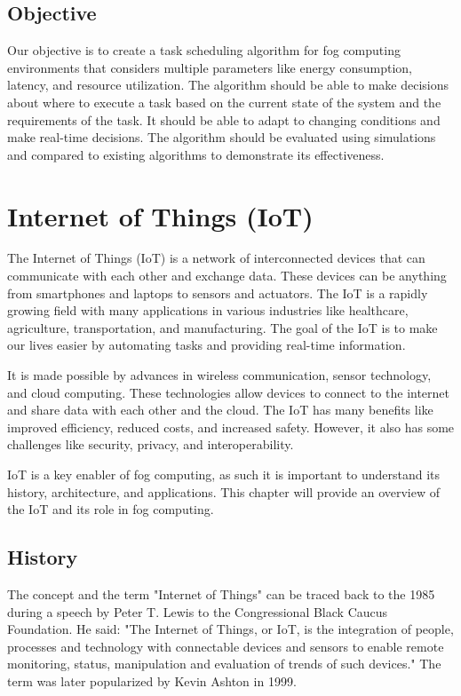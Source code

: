 \section{Objective}
\label{sec:objective}

Our objective is to create a task scheduling algorithm for fog computing environments that considers multiple
parameters like energy consumption, latency, and resource utilization. The algorithm should be able to make decisions
about where to execute a task based on the current state of the system and the requirements of the task. It should be
able to adapt to changing conditions and make real-time decisions. The algorithm should be evaluated using simulations
and compared to existing algorithms to demonstrate its effectiveness.

\chapter{Internet of Things (IoT)}
\label{chap:iot}

The Internet of Things (IoT) is a network of interconnected devices that can communicate with each other and exchange
data. These devices can be anything from smartphones and laptops to sensors and actuators. The IoT is a rapidly growing
field with many applications in various industries like healthcare, agriculture, transportation, and manufacturing.
The goal of the IoT is to make our lives easier by automating tasks and providing real-time information.

It is made possible by advances in wireless communication, sensor technology, and cloud computing. These technologies
allow devices to connect to the internet and share data with each other and the cloud. The IoT has many benefits like
improved efficiency, reduced costs, and increased safety. However, it also has some challenges like security, privacy,
and interoperability.

IoT is a key enabler of fog computing, as such it is important to understand its history, architecture, and applications.
This chapter will provide an overview of the IoT and its role in fog computing.

\section{History}
\label{sec:iot-history}

The concept and the term "Internet of Things" can be traced back to the 1985 during a speech by Peter T. Lewis to the
Congressional Black Caucus Foundation.\cite{chetansharma-2016} He said: "The Internet of Things, or IoT, is the
integration of people, processes and technology with connectable devices and sensors to enable remote monitoring,
status, manipulation and evaluation of trends of such devices." The term was later popularized by Kevin Ashton in
1999.\cite{ashton-2009}

